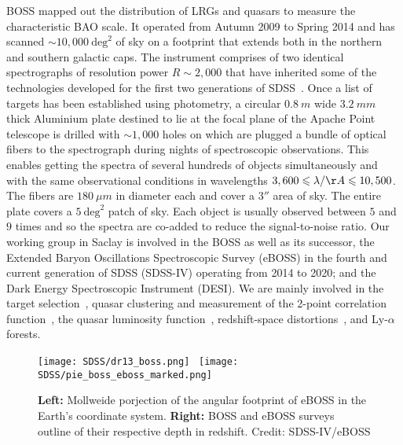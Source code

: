 BOSS mapped out the distribution of LRGs and quasars to measure the characteristic BAO scale. It operated from Autumn 2009 to Spring 2014 and has scanned $\sim 10,000~\mathrm{deg}^2$ of sky on a footprint that extends both in the northern and southern galactic caps. The instrument comprises of two identical spectrographs of resolution power $R \sim 2,000$ that have inherited some of the technologies developed for the first two generations of SDSS~\citep{Smee2013}. Once a list of targets has been established using photometry, a circular $0.8~m$ wide $3.2~mm$ thick Aluminium plate destined to lie at the focal plane of the Apache Point telescope is drilled with $\sim 1,000$ holes on which are plugged a bundle of optical fibers to the spectrograph during nights of spectroscopic observations. This enables getting the spectra of several hundreds of objects simultaneously and with the same observational conditions in wavelengths $3,600 \leqslant \lambda / {\AA} \leqslant 10,500$. The fibers are $180 ~\mu m$ in diameter each and cover a $3''$ area of sky. The entire plate covers a $5~\mathrm{deg}^2$ patch of sky. Each object is usually observed between $5$ and $9$ times and so the spectra are co-added to reduce the signal-to-noise ratio. Our working group in Saclay is involved in the BOSS as well as its successor, the Extended Baryon Oscillations Spectroscopic Survey (eBOSS) in the fourth and current generation of SDSS (SDSS-IV) operating from 2014 to 2020;  and the Dark Energy Spectroscopic Instrument (DESI). We are mainly involved in the target selection~\citep{Ross2012, Raichoor17}, quasar clustering and measurement of the 2-point correlation function~\citep{PierreLaurent1, PierreLaurent2}, the quasar luminosity function~\citep{QSO_luminosity_function}, redshift-space distortions~\citep{RSD}, and Ly-$\alpha$ forests.\\

\begin{figure}
\begin{center}
\texttt{[image: SDSS/dr13\_boss.png]}~%
\texttt{[image: SDSS/pie\_boss\_eboss\_marked.png]}
\caption{\textbf{Left:} Mollweide porjection of the angular footprint of eBOSS in the Earth's coordinate system. \textbf{Right:} BOSS and eBOSS surveys outline of their respective depth in redshift. Credit: SDSS-IV/eBOSS}
\label{fig:bosseboss}
\end{center}
\end{figure}


